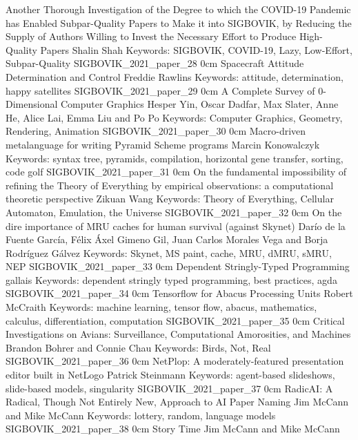 \addpaper
	{Another Thorough Investigation of the Degree to which the COVID-19 Pandemic has Enabled Subpar-Quality Papers to Make it into SIGBOVIK, by Reducing the Supply of Authors Willing to Invest the Necessary Effort to Produce High-Quality Papers}
	{Shalin Shah}
	{Keywords: SIGBOVIK, COVID-19, Lazy, Low-Effort, Subpar-Quality}
	{SIGBOVIK_2021_paper_28}
	{0cm}
	{}
\addpaper
	{Spacecraft Attitude Determination and Control}
	{Freddie Rawlins}
	{Keywords: attitude, determination, happy satellites}
	{SIGBOVIK_2021_paper_29}
	{0cm}
	{}
\addpaper
	{A Complete Survey of 0-Dimensional Computer Graphics}
	{Hesper Yin, Oscar Dadfar, Max Slater, Anne He, Alice Lai, Emma Liu and Po Po}
	{Keywords: Computer Graphics, Geometry, Rendering, Animation}
	{SIGBOVIK_2021_paper_30}
	{0cm}
	{}
\addpaper
	{Macro-driven metalanguage for writing Pyramid Scheme programs}
	{Marcin Konowalczyk}
	{Keywords: syntax tree, pyramids, compilation, horizontal gene transfer, sorting, code golf}
	{SIGBOVIK_2021_paper_31}
	{0cm}
	{}
\addpaper
	{On the fundamental impossibility of refining the Theory of Everything by empirical observations: a computational theoretic perspective}
	{Zikuan Wang}
	{Keywords: Theory of Everything, Cellular Automaton, Emulation, the Universe}
	{SIGBOVIK_2021_paper_32}
	{0cm}
	{}
\addpaper
	{On the dire importance of MRU caches for human survival (against Skynet)}
	{Darío de la Fuente García, Félix Áxel Gimeno Gil, Juan Carlos Morales Vega and Borja Rodríguez Gálvez}
	{Keywords: Skynet, MS paint, cache, MRU, dMRU, sMRU, NEP}
	{SIGBOVIK_2021_paper_33}
	{0cm}
	{}
\addpaper
	{Dependent Stringly-Typed Programming}
	{gallais}
	{Keywords: dependent stringly typed programming, best practices, agda}
	{SIGBOVIK_2021_paper_34}
	{0cm}
	{}
\addpaper
	{Tensorflow for Abacus Processing Units}
	{Robert McCraith}
	{Keywords: machine learning, tensor flow, abacus, mathematics, calculus, differentiation, computation}
	{SIGBOVIK_2021_paper_35}
	{0cm}
	{}
\addpaper
	{Critical Investigations on Avians: Surveillance, Computational Amorosities, and Machines}
	{Brandon Bohrer and Connie Chau}
	{Keywords: Birds, Not, Real}
	{SIGBOVIK_2021_paper_36}
	{0cm}
	{}
\addpaper
	{NetPlop: A moderately-featured presentation editor built in NetLogo}
	{Patrick Steinmann}
	{Keywords: agent-based slideshows, slide-based models, singularity}
	{SIGBOVIK_2021_paper_37}
	{0cm}
	{}
\addpaper
	{RadicAI: A Radical, Though Not Entirely New, Approach to AI Paper Naming}
	{Jim McCann and Mike McCann}
	{Keywords: lottery, random, language models}
	{SIGBOVIK_2021_paper_38}
	{0cm}
	{}
\addpaper
	{Story Time}
	{Jim McCann and Mike McCann}
